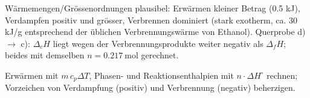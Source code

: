 \begin{kontrolle}
Wärmemengen/Grössenordnungen plausibel: Erwärmen kleiner Betrag
(0.5 kJ), Verdampfen positiv und grösser, Verbrennen dominiert (stark
exotherm, ca. 30 kJ/g entsprechend der üblichen Verbrennungswärme von
Ethanol). Querprobe d) $\to$ c): $\Delta_cH$ liegt wegen der
Verbrennungsprodukte weiter negativ als $\Delta_fH$; beides mit demselben
$n = 0.217\ \mathrm{mol}$ gerechnet.
\end{kontrolle}

\begin{merksatz}
Erwärmen mit $m\,c_p\Delta T$, Phasen- und Reaktionsenthalpien mit
$n\cdot\Delta H^\circ$ rechnen; Vorzeichen von Verdampfung (positiv) und
Verbrennung (negativ) beherzigen.
\end{merksatz}
